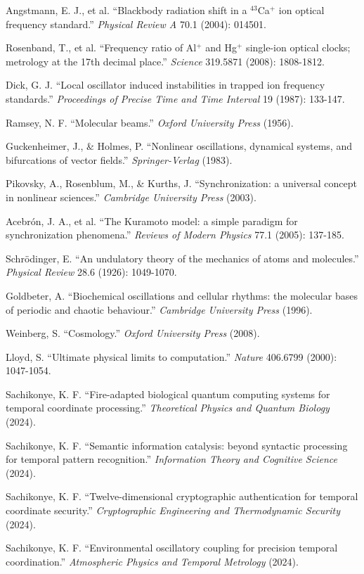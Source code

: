 \documentclass[11pt]{article}
\theoremstyle{remark}
\begin{document}
\begin{thebibliography}{99}
Angstmann, E. J., et al. ``Blackbody radiation shift in a $^{43}$Ca$^+$ ion optical frequency standard.'' \textit{Physical Review A} 70.1 (2004): 014501.

Rosenband, T., et al. ``Frequency ratio of Al$^+$ and Hg$^+$ single-ion optical clocks; metrology at the 17th decimal place.'' \textit{Science} 319.5871 (2008): 1808-1812.

Dick, G. J. ``Local oscillator induced instabilities in trapped ion frequency standards.'' \textit{Proceedings of Precise Time and Time Interval} 19 (1987): 133-147.

Ramsey, N. F. ``Molecular beams.'' \textit{Oxford University Press} (1956).

Guckenheimer, J., \& Holmes, P. ``Nonlinear oscillations, dynamical systems, and bifurcations of vector fields.'' \textit{Springer-Verlag} (1983).

Pikovsky, A., Rosenblum, M., \& Kurths, J. ``Synchronization: a universal concept in nonlinear sciences.'' \textit{Cambridge University Press} (2003).

Acebrón, J. A., et al. ``The Kuramoto model: a simple paradigm for synchronization phenomena.'' \textit{Reviews of Modern Physics} 77.1 (2005): 137-185.

Schrödinger, E. ``An undulatory theory of the mechanics of atoms and molecules.'' \textit{Physical Review} 28.6 (1926): 1049-1070.

Goldbeter, A. ``Biochemical oscillations and cellular rhythms: the molecular bases of periodic and chaotic behaviour.'' \textit{Cambridge University Press} (1996).

Weinberg, S. ``Cosmology.'' \textit{Oxford University Press} (2008).

Lloyd, S. ``Ultimate physical limits to computation.'' \textit{Nature} 406.6799 (2000): 1047-1054.

Sachikonye, K. F. ``Fire-adapted biological quantum computing systems for temporal coordinate processing.'' \textit{Theoretical Physics and Quantum Biology} (2024).

Sachikonye, K. F. ``Semantic information catalysis: beyond syntactic processing for temporal pattern recognition.'' \textit{Information Theory and Cognitive Science} (2024).

Sachikonye, K. F. ``Twelve-dimensional cryptographic authentication for temporal coordinate security.'' \textit{Cryptographic Engineering and Thermodynamic Security} (2024).

Sachikonye, K. F. ``Environmental oscillatory coupling for precision temporal coordination.'' \textit{Atmospheric Physics and Temporal Metrology} (2024).

\end{thebibliography}
\end{document}
